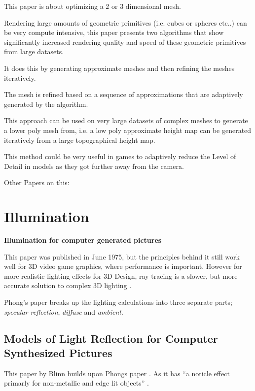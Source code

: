 \documentclass{scrartcl}
\begin{document}
This paper is about optimizing a 2 or 3 dimensional mesh. 

Rendering large amounts  of geometric primitives (i.e. cubes or spheres etc..) can be very compute intensive, this paper presents two algorithms that show significantly increased rendering quality and speed of these geometric primitives from large datasets.

It does this by generating approximate meshes and then refining the meshes iteratively. 

The mesh is refined based on a sequence of approximations that are adaptively generated by the algorithm.

This approach can be used on very large datasets of complex meshes to generate a lower poly mesh from, i.e. a low poly approximate height map can be generated iteratively from a large topographical height map.

This method could be very useful in games to adaptively reduce the Level of Detail in models as they got further away from the camera.


Other Papers on this:
\cite{carey1981mesh}










\section{Illumination}
\textbf{Illumination for computer generated pictures \cite{phong1975illumination}}

This paper was published in June 1975, but the principles behind it still work well for 3D video game graphics, where performance is important. However for more realistic lighting effects for 3D Design, ray tracing is a slower, but more accurate solution to complex 3D lighting \cite{Shirley:2005:RayTracing}.

Phong's paper breaks up the lighting calculations into three separate parts; \textit{specular reflection}, \textit{diffuse} and \textit{ambient}.



\subsection{Models of Light Reflection for Computer Synthesized Pictures \cite{Blinn1977}}
This paper by Blinn builds upon Phongs paper \cite{phong1975illumination}. As it has ``a noticle effect primarly for non-metallic and edge lit objects'' \cite{Blinn1977}. 
\end{document}
